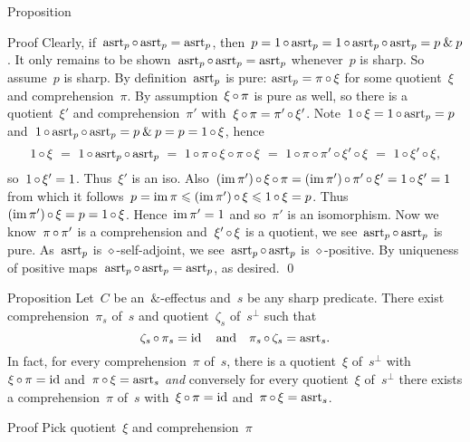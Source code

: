 \documentclass[b]{subfiles}
\begin{document}
\begin{parsec}
\begin{point}{Proposition}
\begin{point}{Proof}
Clearly, if~$\mathrm{asrt}_p \mathop{\circ} \mathrm{asrt}_p = \mathrm{asrt}_p$,
then~$p = 1 \mathop{\circ} \mathrm{asrt}_p = 1\mathop{\circ}\mathrm{asrt}_p\mathop{\circ}\mathrm{asrt}_p = p \mathbin{\&} p$.
It only remains to be shown~$\mathrm{asrt}_p \mathop{\circ} \mathrm{asrt}_p = \mathrm{asrt}_p$
    whenever~$p$ is sharp.
So assume~$p$ is sharp.
By definition~$\mathrm{asrt}_p$ is pure: $\mathrm{asrt}_p = \pi \mathop{\circ} \xi$
    for some quotient~$\xi$ and comprehension~$\pi$.
By assumption~$\xi \mathop{\circ} \pi$ is pure as well,
    so there is a quotient~$\xi'$ and comprehension~$\pi'$
    with~$\xi \mathop{\circ} \pi = \pi' \mathop{\circ} \xi'$.
Note~$1 \mathop{\circ} \xi = 1 \mathop{\circ} \mathrm{asrt}_p = p$
and~$1 \mathop{\circ} \mathrm{asrt}_p \mathop{\circ} \mathrm{asrt}_p = p \mathbin{\&} p = p = 1 \mathop{\circ} \xi$,
hence
\begin{equation*}
 1\mathop{\circ} \xi  
    \ =\  1 \mathop{\circ} \mathrm{asrt}_p \mathop{\circ} \mathrm{asrt}_p 
    \ =\  1 \mathop{\circ} \pi \mathop{\circ} \xi \mathop{\circ} \pi \mathop{\circ} \xi 
    \ =\  1 \mathop{\circ} \pi \mathop{\circ} \pi' \mathop{\circ} \xi' \mathop{\circ} \xi 
    \ =\  1 \mathop{\circ} \xi' \mathop{\circ} \xi,
\end{equation*}
so~$1 \mathop{\circ} \xi' = 1$. Thus~$\xi'$ is an iso.
Also~$
    (\operatorname{im} \pi') \mathop{\circ} \xi \mathop{\circ} \pi
    = (\operatorname{im} \pi') \mathop{\circ} \pi' \mathop{\circ} \xi'
    = 1 \mathop{\circ} \xi' = 1 $
    from which it follows~$p = \operatorname{im} \pi \leqslant  (\operatorname{im} \pi') \mathop{\circ} \xi 
            \leqslant 1 \mathop{\circ} \xi = p$.
Thus~$(\operatorname{im} \pi') \mathop{\circ} \xi = p = 1\mathop{\circ} \xi$.
Hence~$\operatorname{im} \pi' = 1$ and so~$\pi'$ is an isomorphism.
Now we know~$\pi \mathop{\circ} \pi'$
    is a comprehension and~$\xi' \mathop{\circ} \xi$ is a quotient,
    we see~$\mathrm{asrt}_p\mathop{\circ}\mathrm{asrt}_p$ is pure.
As~$\mathrm{asrt}_p$ is $\diamond$-self-adjoint,
    we see~$\mathrm{asrt}_p\mathop{\circ}\mathrm{asrt}_p$ is $\diamond$-positive.
By uniqueness of positive maps~$\mathrm{asrt}_p \mathop{\circ} \mathrm{asrt}_p = \mathrm{asrt}_p$,
    as desired. \qed
\end{point}    
\end{point}
\begin{point}{Proposition}%
Let~$C$ be an~$\&$-effectus and~$s$
     be any sharp predicate.
There exist comprehension~$\pi_s$ of~$s$
        and quotient~$\zeta_s$ of~$s^\perp$ such that
\begin{equation*}
    \zeta_s \mathop{\circ} \pi_s = \operatorname{id} \quad \text{and} \quad
        \pi_s \mathop{\circ} \zeta_s = \mathrm{asrt}_s.
\end{equation*}
In fact, for every comprehension~$\pi$ of~$s$,
    there is a quotient~$\xi$ of~$s^\perp$
    with~$\xi \mathop{\circ} \pi = \operatorname{id}$ and~$\pi \mathop{\circ} \xi = \mathrm{asrt}_s$
    \emph{and} conversely for every quotient~$\xi$ of~$s^\perp$
    there exists a comprehension~$\pi$ of~$s$
    with~$\xi \mathop{\circ} \pi = \operatorname{id}$ and~$\pi \mathop{\circ} \xi = \mathrm{asrt}_s$.
\begin{point}{Proof}%
Pick quotient~$\xi$ and comprehension~$\pi$

\end{point}
\end{point}
\end{parsec}
\end{document}
